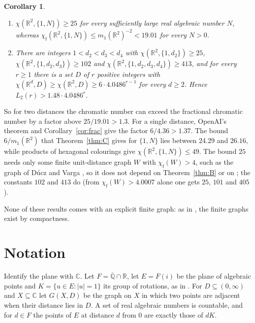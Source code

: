 \documentclass[11pt,a4paper]{amsart}
\newtheorem{corollary}[theorem]{Corollary}
\theoremstyle{definition}
\theoremstyle{remark}
\newcommand{\C}{\mathbb{C}}
\newcommand{\Q}{\mathbb{Q}}
\newcommand{\R}{\mathbb{R}}
\newcommand{\chif}{\chi_{\mathrm f}}
\begin{document}
\begin{corollary}\label{cor:scales}
\begin{enumerate}
\item $\chi(\R^2,\{1,N\})\ge25$ for every sufficiently large real algebraic number $N$, whereas
$\chif(\R^2,\{1,N\})\le m_1(\R^2)^{-2}<19.01$ for every $N>0$.
\item There are integers $1<d_2<d_3<d_4$ with $\chi(\R^2,\{1,d_2\})\ge25$, $\chi(\R^2,\{1,d_2,d_3\})\ge102$ and
$\chi(\R^2,\{1,d_2,d_3,d_4\})\ge413$, and for every $r\ge1$ there is a set $D$ of $r$ positive integers with
$\chi(\R^d,D)\ge\chi(\R^2,D)\ge6\cdot4.0486^{r-1}$ for every $d\ge2$. Hence $L_2(r)>1.48\cdot4.0486^r$.
\end{enumerate}
\end{corollary}

So for two distances the chromatic number can exceed the fractional chromatic number by a factor above
$25/19.01>1.3$. For a single distance, OpenAI's theorem and Corollary~\ref{cor:frac} give the factor $6/4.36>1.37$.
The bound $6/m_1(\R^2)$ that Theorem~\ref{thm:C} gives for $\{1,N\}$ lies between $24.29$ and $26.16$, while products
of hexagonal colourings give $\chi(\R^2,\{1,N\})\le49$. The bound $25$ needs only some finite unit-distance
graph $W$ with $\chif(W)>4$, such as the graph of Dúcz and Varga \cite{DV}, so it does not depend on
Theorem~\ref{thm:B} or on \cite{ACMVZ}; the constants $102$ and $413$ do (from $\chif(W)>4.0007$ alone one gets
$25$, $101$ and $405$).

None of these results comes with an explicit finite graph: as in \cite{OpenAI}, the finite graphs exist by
compactness.

\section{Notation}\label{sec:notation}

Identify the plane with $\C$. Let $F=\overline{\Q}\cap\R$, let $E=F(i)$ be the plane of algebraic points and
$K=\{u\in E:|u|=1\}$ its group of rotations, as in \cite[Def.~2.1]{OpenAI}. For $D\subseteq(0,\infty)$ and
$X\subseteq\C$ let $G(X,D)$ be the graph on $X$ in which two points are adjacent when their distance lies in $D$. A
set of real algebraic numbers is countable, and for $d\in F$ the points of $E$ at distance $d$ from $0$ are exactly
those of $dK$.
\end{document}
